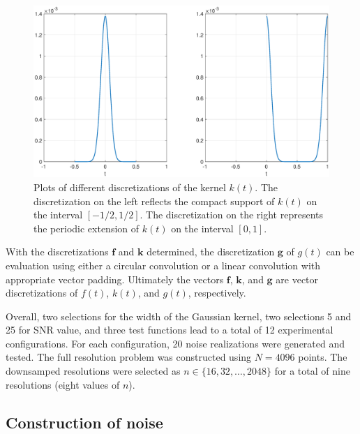\documentclass[12pt]{article}
\newcommand{\gcon}{g}
\newcommand{\kcon}{k}
\newcommand{\fcon}{f}
\newcommand{\gdis}{\mathbf{g}}
\newcommand{\kdis}{\mathbf{k}}
\newcommand{\fdis}{\mathbf{f}}
\begin{document}
\begin{figure}
	\centerline{\includegraphics[scale = 0.45]{Figures/RegAndTroughGaussian.eps}}
\caption{Plots of different discretizations of the kernel $\kcon(t)$. The discretization on the left reflects the compact support of $\kcon(t)$ on the interval $[-1/2,1/2]$. The discretization on the right represents the periodic extension of $\kcon(t)$ on the interval $[0,1]$.}
\label{RegAndTroughGaussian}
\end{figure}

With the discretizations $\fdis$ and $\kdis$ determined, the discretization $\gdis$ of $\gcon(t)$ can be evaluation using either a circular convolution or a linear convolution with appropriate vector padding. Ultimately the vectors $\fdis$, $\kdis$, and $\gdis$ are vector discretizations of $\fcon(t)$, $\kcon(t)$, and $\gcon(t)$, respectively. \par
Overall, two selections for the width of the Gaussian kernel, two selections 5 and 25 for SNR value, and three test functions lead to a total of 12 experimental configurations. For each configuration, 20 noise realizations were generated and tested. The full resolution problem was constructed using $N = 4096$ points. The downsamped resolutions were selected as $n \in \{16,32,\ldots,2048\}$ for a total of nine resolutions (eight values of $n$).

\subsection{Construction of noise} \label{Construction of noise}
\end{document}
